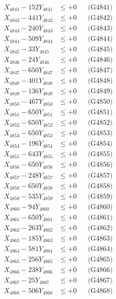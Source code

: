 \documentclass[a4paper,10pt]{article}
\begin{document}
{\begin{align}
\allowbreak
X_{4841} - 152Y_{4841} &\leq +0 && \text{(G4841)} \\
X_{4842} - 441Y_{4842} &\leq +0 && \text{(G4842)} \\
X_{4843} - 240Y_{4843} &\leq +0 && \text{(G4843)} \\
X_{4844} - 509Y_{4844} &\leq +0 && \text{(G4844)} \\
X_{4845} - 33Y_{4845} &\leq +0 && \text{(G4845)} \\
X_{4846} - 24Y_{4846} &\leq +0 && \text{(G4846)} \\
X_{4847} - 650Y_{4847} &\leq +0 && \text{(G4847)} \\
X_{4848} - 401Y_{4848} &\leq +0 && \text{(G4848)} \\
X_{4849} - 136Y_{4849} &\leq +0 && \text{(G4849)} \\
X_{4850} - 467Y_{4850} &\leq +0 && \text{(G4850)} \\
\allowbreak
X_{4851} - 650Y_{4851} &\leq +0 && \text{(G4851)} \\
X_{4852} - 650Y_{4852} &\leq +0 && \text{(G4852)} \\
X_{4853} - 650Y_{4853} &\leq +0 && \text{(G4853)} \\
X_{4854} - 196Y_{4854} &\leq +0 && \text{(G4854)} \\
X_{4855} - 643Y_{4855} &\leq +0 && \text{(G4855)} \\
X_{4856} - 650Y_{4856} &\leq +0 && \text{(G4856)} \\
X_{4857} - 248Y_{4857} &\leq +0 && \text{(G4857)} \\
X_{4858} - 650Y_{4858} &\leq +0 && \text{(G4858)} \\
X_{4859} - 535Y_{4859} &\leq +0 && \text{(G4859)} \\
X_{4860} - 94Y_{4860} &\leq +0 && \text{(G4860)} \\
\allowbreak
X_{4861} - 650Y_{4861} &\leq +0 && \text{(G4861)} \\
X_{4862} - 263Y_{4862} &\leq +0 && \text{(G4862)} \\
X_{4863} - 185Y_{4863} &\leq +0 && \text{(G4863)} \\
X_{4864} - 581Y_{4864} &\leq +0 && \text{(G4864)} \\
X_{4865} - 256Y_{4865} &\leq +0 && \text{(G4865)} \\
X_{4866} - 238Y_{4866} &\leq +0 && \text{(G4866)} \\
X_{4867} - 25Y_{4867} &\leq +0 && \text{(G4867)} \\
X_{4868} - 506Y_{4868} &\leq +0 && \text{(G4868)} \\

\end{align}}
\end{document}
